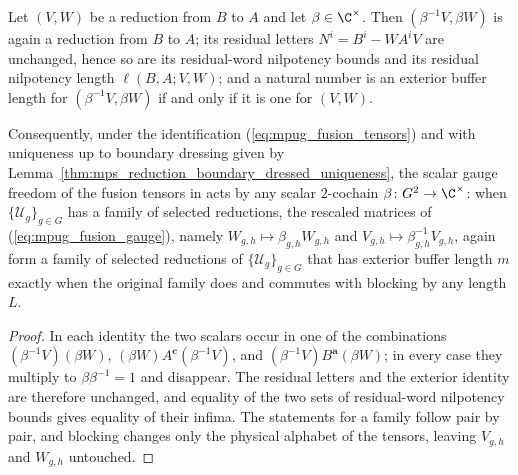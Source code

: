\begin{lemma}
    \label{thm:mpug_fusion_scalar_gauge}
    \leanok
    Let $(V,W)$ be a reduction from $B$ to $A$ and let
    $\beta\in\C^\times$.  Then $(\beta^{-1}V,\beta W)$ is again a reduction
    from $B$ to $A$; its residual letters $N^i=B^i-WA^iV$ are unchanged, hence
    so are its residual-word nilpotency bounds and its residual nilpotency
    length $\ell(B,A;V,W)$; and a natural number is an exterior buffer length
    for $(\beta^{-1}V,\beta W)$ if and only if it is one for $(V,W)$.

    Consequently, under the identification (\ref{eq:mpug_fusion_tensors}) and
    with uniqueness up to boundary dressing given by
    Lemma~\ref{thm:mps_reduction_boundary_dressed_uniqueness}, the scalar
    gauge freedom of the fusion tensors in
    \cite[lines~1500--1504]{FrancoRubio2025MPUGauging} acts by any scalar
    $2$-cochain $\beta\colon G^2\to\C^\times$: when $\{\mathcal U_g\}_{g\in G}$
    has a family of selected reductions, the rescaled matrices of
    (\ref{eq:mpug_fusion_gauge}), namely $W_{g,h}\mapsto\beta_{g,h}W_{g,h}$ and
    $V_{g,h}\mapsto\beta_{g,h}^{-1}V_{g,h}$, again form a family of selected
    reductions of $\{\mathcal U_g\}_{g\in G}$ that has exterior buffer length
    $m$ exactly when the original family does and commutes with blocking by any
    length $L$.
\end{lemma}

\begin{proof}
    \leanok
    In each identity the two scalars occur in one of the combinations
    $(\beta^{-1}V)(\beta W)$, $(\beta W)A^{\mathbf c}(\beta^{-1}V)$, and
    $(\beta^{-1}V)B^{\mathbf a}(\beta W)$; in every case they multiply to
    $\beta\beta^{-1}=1$ and disappear.  The residual letters and the exterior
    identity are therefore unchanged, and equality of the two sets of
    residual-word nilpotency bounds gives equality of their infima.  The
    statements for a family follow pair by pair, and blocking changes only the
    physical alphabet of the tensors, leaving $V_{g,h}$ and $W_{g,h}$
    untouched.
\end{proof}

